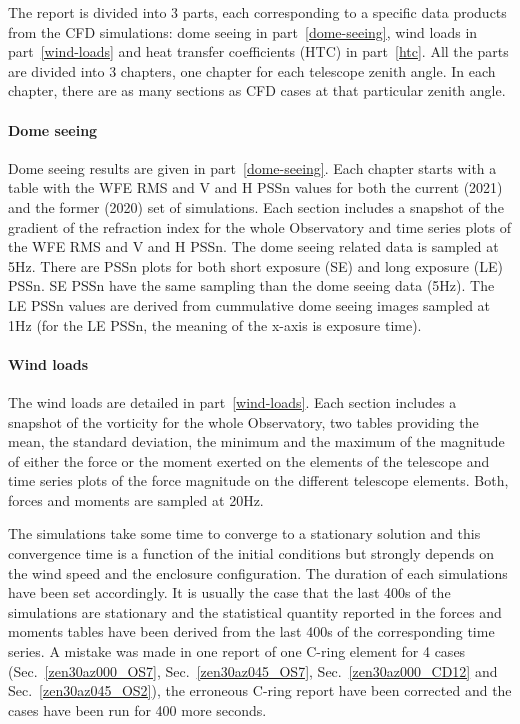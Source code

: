 The report is divided into 3 parts, each corresponding to a specific data products from the CFD simulations: dome seeing in part~\ref{dome-seeing}, wind loads in part~\ref{wind-loads} and heat transfer coefficients (HTC) in part~\ref{htc}.
All the parts are divided into 3 chapters, one chapter for each telescope zenith angle.
In each chapter, there are as many sections as CFD cases at that particular zenith angle.

\paragraph{Dome seeing}

Dome seeing results are given in part~\ref{dome-seeing}.
Each chapter starts with a table with the WFE RMS and V and H PSSn values for both the current (2021) and the former (2020) set of simulations.
Each section includes a snapshot of the gradient of the refraction index for the whole Observatory and time series plots of the WFE RMS and V and H PSSn.
The dome seeing related data is sampled at 5Hz.
There are PSSn plots for both short exposure (SE) and long exposure (LE) PSSn.
SE PSSn have the same sampling than the dome seeing data (5Hz).
The LE PSSn values are derived from cummulative dome seeing images sampled at 1Hz (for the LE PSSn, the meaning of the x-axis is exposure time).

\paragraph{Wind loads}

The wind loads are detailed in part~\ref{wind-loads}.
Each section includes a snapshot of the vorticity for the whole Observatory,
two tables providing the mean, the standard deviation, the minimum and the
maximum of the magnitude of either the force or the moment exerted on the
elements of the telescope and time series plots of the force magnitude on the
different telescope elements.
Both, forces and moments are sampled at 20Hz.

The simulations take some time to converge to a stationary solution and this convergence time is a function of the initial conditions but strongly depends on the wind speed and the enclosure configuration.
The duration of each simulations have been set accordingly.
It is usually the case that the last 400s of the simulations are stationary and
the statistical quantity reported in the forces and moments tables have been derived from
the last 400s of the corresponding time series.
A mistake was made in one report of one C-ring element for 4 cases (Sec.~\ref{zen30az000_OS7}, Sec.~\ref{zen30az045_OS7}, Sec.~\ref{zen30az000_CD12} and Sec.~\ref{zen30az045_OS2}), the erroneous C-ring report have been corrected and the cases have been run for 400 more seconds. 

